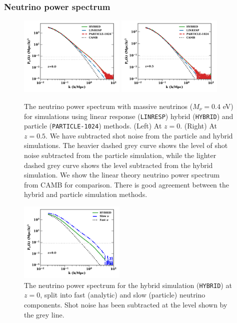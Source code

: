 \documentclass[useAMS, usenatbib]{mnras}
\begin{document}
\subsubsection{Neutrino power spectrum}

\begin{figure}
\includegraphics[width=0.45\textwidth]{nuplots/pks-nu-1.pdf}
\includegraphics[width=0.45\textwidth]{nuplots/pks-nu-0_6667.pdf}
  \caption{The neutrino power spectrum with massive neutrinos ($M_\nu = 0.4$ eV) for simulations using linear response (\texttt{LINRESP}) hybrid (\texttt{HYBRID}) and particle (\texttt{PARTICLE-1024}) methods. (Left) At $z=0$. (Right) At $z=0.5$. We have subtracted shot noise from the particle and hybrid simulations. The heavier dashed grey curve shows the level of shot noise subtracted from the particle simulation, while the lighter dashed grey curve shows the level subtracted from the hybrid simulation. We show the linear theory neutrino power spectrum from CAMB for comparison. There is good agreement between the hybrid and particle simulation methods.}
  \label{fig:neutrino_power}
\end{figure}

\begin{figure}
\includegraphics[width=0.45\textwidth]{nuplots/pks-nu-split-1.pdf}
  \caption{The neutrino power spectrum for the hybrid simulation (\texttt{HYBRID}) at $z=0$, split into fast (analytic) and slow (particle) neutrino components. Shot noise has been subtracted at the level shown by the grey line.}
  \label{fig:neutrino_power_split}
\end{figure}
\end{document}

